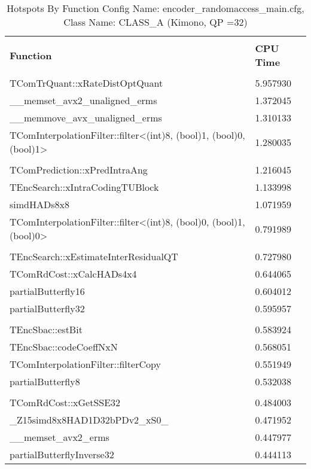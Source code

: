 \documentclass{article}%
\begin{document}
\begin{longtabu}{| X[l] | X[l] |}%
\caption{%
Hotspots By Function\newline%
 Config Name: encoder\_randomaccess\_main.cfg,\newline%
 Class Name: CLASS\_A\newline%
 (Kimono, QP =32)%
}%
\hline%
&\\%
\textbf{Function}&\textbf{CPU Time}\\%
&\\%
\hline%
\endhead%
TComTrQuant::xRateDistOptQuant&5.957930\\%
\hline%
\_\_memset\_avx2\_unaligned\_erms&1.372045\\%
\hline%
\_\_memmove\_avx\_unaligned\_erms&1.310133\\%
\hline%
TComInterpolationFilter::filter<(int)8, (bool)1, (bool)0, (bool)1>&1.280035\\%
\hline%
&\\%
\hline%
TComPrediction::xPredIntraAng&1.216045\\%
\hline%
TEncSearch::xIntraCodingTUBlock&1.133998\\%
\hline%
simdHADs8x8&1.071959\\%
\hline%
TComInterpolationFilter::filter<(int)8, (bool)0, (bool)1, (bool)0>&0.791989\\%
\hline%
&\\%
\hline%
TEncSearch::xEstimateInterResidualQT&0.727980\\%
\hline%
TComRdCost::xCalcHADs4x4&0.644065\\%
\hline%
partialButterfly16&0.604012\\%
\hline%
partialButterfly32&0.595957\\%
\hline%
&\\%
\hline%
TEncSbac::estBit&0.583924\\%
\hline%
TEncSbac::codeCoeffNxN&0.568051\\%
\hline%
TComInterpolationFilter::filterCopy&0.551949\\%
\hline%
partialButterfly8&0.532038\\%
\hline%
&\\%
\hline%
TComRdCost::xGetSSE32&0.484003\\%
\hline%
\_Z15simd8x8HAD1D32bPDv2\_xS0\_&0.471952\\%
\hline%
\_\_memset\_avx2\_erms&0.447977\\%
\hline%
partialButterflyInverse32&0.444113\\%
\hline%
\end{longtabu}%
\end{document}
